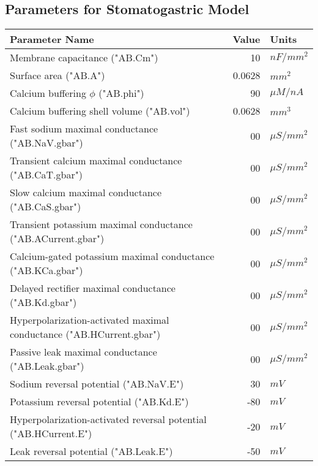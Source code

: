 \documentclass[utf8]{frontiers_suppmat} %
\begin{document}
	\subsection{Parameters for Stomatogastric Model}
	
		\begin{center}
			\begin{tabular}{|l|r|l|}
				\hline 
				\textbf{Parameter Name} & \textbf{Value} & \textbf{Units} \\ 
				\hline 
				Membrane capacitance ("AB.Cm") & 10 & ${nF}/{mm^2}$ \\ 
				\hline 
				Surface area ("AB.A") & 0.0628 & $mm^2$ \\
				\hline
				Calcium buffering $\phi$ ("AB.phi") & 90 & $\mu M / nA$ \\
				\hline
				Calcium buffering shell volume ("AB.vol") & 0.0628 & $mm^3$ \\
				\hline 
				Fast sodium maximal conductance ("AB.NaV.gbar") & 00 & $\mu S/mm^2$ \\ 
				\hline
				Transient calcium maximal conductance ("AB.CaT.gbar") & 00 & $\mu S/mm^2$ \\ 
				\hline 
				Slow calcium maximal conductance ("AB.CaS.gbar") & 00 & $\mu S/mm^2$ \\ 
				\hline 
				Transient potassium maximal conductance ("AB.ACurrent.gbar") & 00 & $\mu S/mm^2$ \\ 
				\hline 
				Calcium-gated potassium maximal conductance ("AB.KCa.gbar") & 00 & $\mu S/mm^2$ \\ 
				\hline 
				Delayed rectifier maximal conductance ("AB.Kd.gbar") & 00 & $\mu S/mm^2$ \\ 
				\hline
				Hyperpolarization-activated maximal conductance ("AB.HCurrent.gbar") & 00 & $\mu S/mm^2$ \\ 
				\hline 
				Passive leak maximal conductance ("AB.Leak.gbar") & 00 & $\mu S/mm^2$ \\ 
				\hline 
				Sodium reversal potential ("AB.NaV.E") & 30 & $mV$ \\ 
				\hline 
				Potassium reversal potential ("AB.Kd.E") & -80 & $mV$ \\ 
				\hline
				Hyperpolarization-activated reversal potential ("AB.HCurrent.E") & -20 & $mV$ \\
				\hline
				Leak reversal potential ("AB.Leak.E") & -50 & $mV$ \\
				\hline
			\end{tabular} 
		\end{center}
	
\end{document}
